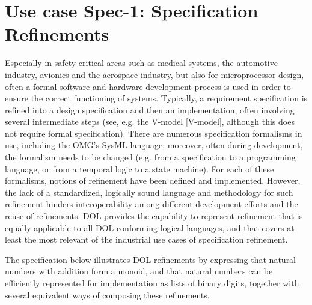 \documentclass[10pt,fleqn,%
\ifpretendfinal
final%
\else
draft%
\fi,
]{scrreprt}
\begin{document}
\section{Use case Spec-1: Specification Refinements}
Especially in safety-critical areas such as medical systems, the automotive industry, avionics and the aerospace industry, but also for microprocessor design, often 
a formal software and hardware development process is used in order to ensure the correct functioning of systems. Typically, a requirement specification is refined 
into a design specification and then an implementation, often involving several intermediate steps (see, e.g. the V-model [V-model], although this does not require 
formal specification).
There are numerous specification formalisms in use, including the OMG's SysML language; moreover, often during development, the formalism needs to be 
changed (e.g. from a specification to a programming language, or from a temporal logic to a state machine). For each of these formalisms, notions of refinement 
have been defined and implemented. However, the lack of a standardized, logically sound language and methodology for such refinement hinders interoperability 
among different development efforts and the reuse of refinements.
DOL  provides the capability to represent refinement that is equally applicable to all DOL-conforming logical languages, and that  
covers at least the most relevant of the industrial use cases of specification refinement.

The specification below illustrates DOL refinements by expressing that natural numbers with addition form a monoid, and that 
natural numbers can be efficiently represented for implementation as lists of binary digits, together with several equivalent
ways of composing these refinements.
\end{document}
